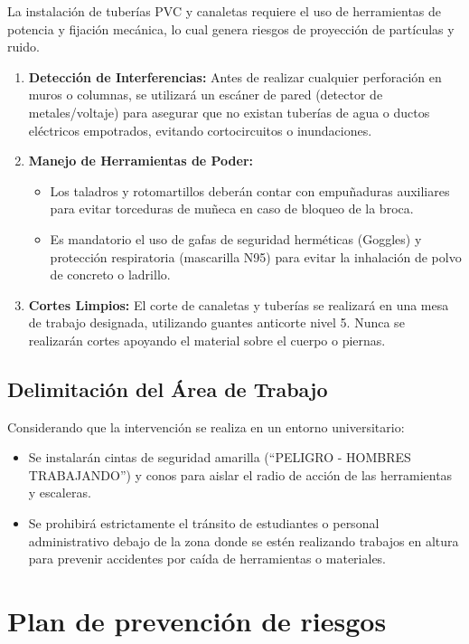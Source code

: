 La instalación de tuberías PVC y canaletas requiere el uso de herramientas de potencia y fijación mecánica, lo cual genera riesgos de proyección de partículas y ruido.

\begin{enumerate}
    \item \textbf{Detección de Interferencias:} Antes de realizar cualquier perforación en muros o columnas, se utilizará un escáner de pared (detector de metales/voltaje) para asegurar que no existan tuberías de agua o ductos eléctricos empotrados, evitando cortocircuitos o inundaciones.
    \item \textbf{Manejo de Herramientas de Poder:}
    \begin{itemize}
        \item Los taladros y rotomartillos deberán contar con empuñaduras auxiliares para evitar torceduras de muñeca en caso de bloqueo de la broca.
        \item Es mandatorio el uso de gafas de seguridad herméticas (Goggles) y protección respiratoria (mascarilla N95) para evitar la inhalación de polvo de concreto o ladrillo.
    \end{itemize}
    \item \textbf{Cortes Limpios:} El corte de canaletas y tuberías se realizará en una mesa de trabajo designada, utilizando guantes anticorte nivel 5. Nunca se realizarán cortes apoyando el material sobre el cuerpo o piernas.
\end{enumerate}

\subsection*{Delimitación del Área de Trabajo}

Considerando que la intervención se realiza en un entorno universitario:

\begin{itemize}
    \item Se instalarán cintas de seguridad amarilla (``PELIGRO - HOMBRES TRABAJANDO'') y conos para aislar el radio de acción de las herramientas y escaleras.
    \item Se prohibirá estrictamente el tránsito de estudiantes o personal administrativo debajo de la zona donde se estén realizando trabajos en altura para prevenir accidentes por caída de herramientas o materiales.
\end{itemize}

\section{Plan de prevención de riesgos}


